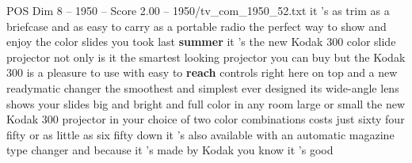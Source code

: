 \begin{textsample}{POS Dim 8 – 1950 – Score 2.00 – 1950/tv\_com\_1950\_52.txt}  \label{ex:f8_pos_013}
it 's as trim as a briefcase and as easy to carry as a portable radio the perfect way to show and enjoy the color slides you took last \textbf{summer} it 's the new Kodak 300 color slide projector not only is it the smartest looking projector you can buy but the Kodak 300 is a pleasure to use with easy to \textbf{reach} controls right here on top and a new readymatic changer the smoothest and simplest ever designed its wide-angle lens shows your slides big and bright and full color in any room large or small the new Kodak 300 projector in your choice of two color combinations costs just sixty four fifty or as little as six fifty down it 's also available with an automatic magazine type changer and because it 's made by Kodak you know it 's good

\end{textsample}
